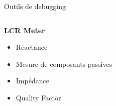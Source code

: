 \begin{frame}[t]{Outils de debugging}
\begin{columns}[T]
        \begin{column}{0.33\textwidth}
            \vspace{-12pt}
            \begin{center}
                \textbf{LCR Meter}
            \end{center}
            \begin{itemize}
                \item Réactance
                \bigskip
                \item Mesure de composants passives
                \item Impédance
                \item Quality Factor
            \end{itemize}
        \end{column}
    \end{columns}
    \vspace{-0.25\textwidth}
    \begin{columns}
        \begin{column}{0.33\textwidth}
        \end{column}
        \begin{column}{0.33\textwidth}
        \end{column}
        \begin{column}{0.33\textwidth}
        \end{column}
    \end{columns}
\end{frame}

